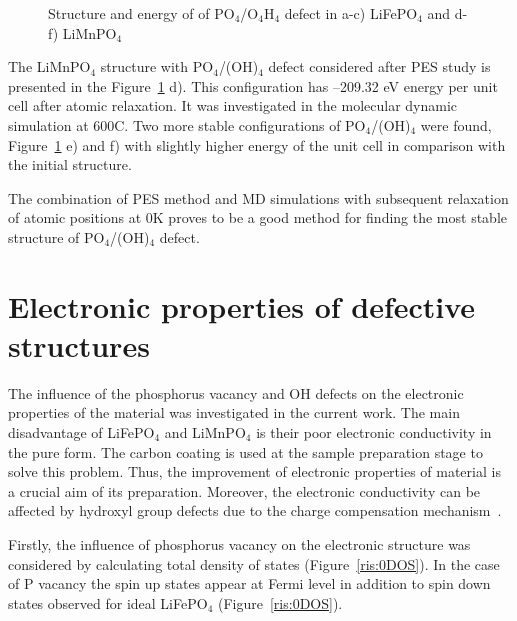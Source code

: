 \begin{figure}[h!]
\begin{minipage}[h]{0.3\linewidth}
\end{minipage}
\caption{Structure and energy of of PO$_4$/O$_4$H$_4$ defect in a-c) LiFePO$_4$ and d-f) LiMnPO$_4$}
\label{ris:OHfinal}
\end{figure}

The LiMnPO$_4$ structure with PO$_4$/(OH)$_4$ defect considered after PES study is presented in the Figure~\ref{ris:OHfinal} d). This configuration has --209.32 eV energy per unit cell after atomic  relaxation. It was investigated in the molecular dynamic simulation at 600\textdegree C. Two more stable configurations of PO$_4$/(OH)$_4$ were found, Figure~\ref{ris:OHfinal} e) and f) with slightly higher energy of the unit cell in comparison with the initial structure.

The combination of PES method and MD simulations with subsequent relaxation of atomic positions at 0K proves to be a good method for finding the most stable structure of PO$_4$/(OH)$_4$ defect. 


\section{Electronic properties of defective structures}

The influence of the phosphorus vacancy and OH defects on the electronic properties of the material was investigated in the current work. The main disadvantage of LiFePO$_4$ and LiMnPO$_4$ is their poor electronic conductivity in the pure form. The carbon coating is used at the sample preparation stage to solve this problem. Thus, the improvement of electronic properties of material is a crucial aim of its preparation. Moreover, the electronic conductivity can be affected by hydroxyl group defects due to the charge compensation mechanism~\cite{sumanov2019hydrotriphylites}. 

Firstly, the influence of phosphorus vacancy on the electronic structure was considered by calculating total density of states (Figure~\ref{ris:0DOS}). In the case of P vacancy the spin up states appear at Fermi level in addition to spin down states observed for ideal LiFePO$_4$ (Figure~\ref{ris:0DOS}). 

